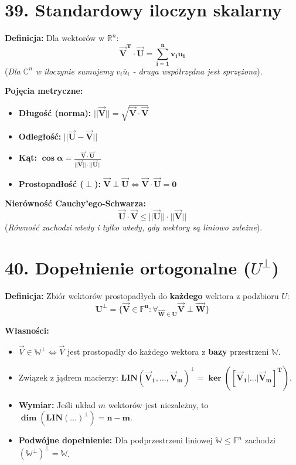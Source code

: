 \documentclass[12pt,a4paper]{article}
\begin{document}
\section*{39. Standardowy iloczyn skalarny}
\noindent\textbf{Definicja:} Dla wektorów w $\mathbb{R}^n$: %
$$ \mathbf{\vec{V}^T \cdot \vec{U} = \sum_{i=1}^n v_i u_i} $$ %
(\textit{Dla $\mathbb{C}^n$ w iloczynie sumujemy $v_i \overline{u}_i$ - druga współrzędna jest sprzężona}). %

\noindent\textbf{Pojęcia metryczne:} %
\begin{itemize}
    \item \textbf{Długość (norma):} $\mathbf{||\vec{V}|| = \sqrt{\vec{V} \cdot \vec{V}}}$ %
    \item \textbf{Odległość:} $\mathbf{||\vec{U} - \vec{V}||}$ %
    \item \textbf{Kąt:} $\mathbf{\cos \alpha = \frac{\vec{V} \cdot \vec{U}}{||\vec{V}|| \cdot ||\vec{U}||}}$ %
    \item \textbf{Prostopadłość ($\perp$):} $\mathbf{\vec{V} \perp \vec{U} \iff \vec{V} \cdot \vec{U} = 0}$ %
\end{itemize}

\noindent\textbf{Nierówność Cauchy'ego-Schwarza:} %
$$ \mathbf{\vec{U} \cdot \vec{V} \le ||\vec{U}|| \cdot ||\vec{V}||} $$ %
(\textit{Równość zachodzi wtedy i tylko wtedy, gdy wektory są liniowo zależne}). %

\section*{40. Dopełnienie ortogonalne ($U^\perp$)}
\noindent\textbf{Definicja:} Zbiór wektorów prostopadłych do \textbf{każdego} wektora z podzbioru $U$: %
$$ \mathbf{U^\perp = \{\vec{V} \in \mathbb{F}^n : \forall_{\vec{W} \in U} \vec{V} \perp \vec{W}\}} $$ %

\noindent\textbf{Własności:} %
\begin{itemize}
    \item $\vec{V} \in \mathbb{W}^\perp \iff \vec{V}$ jest prostopadły do każdego wektora z \textbf{bazy} przestrzeni $\mathbb{W}$. %
    \item Związek z jądrem macierzy: $\mathbf{LIN(\vec{V}_1, \dots, \vec{V}_m)^\perp = \ker([\vec{V}_1 | \dots | \vec{V}_m]^T)}$. %
    \item \textbf{Wymiar:} Jeśli układ $m$ wektorów jest niezależny, to $\mathbf{\dim(LIN(\dots)^\perp) = n - m}$. %
    \item \textbf{Podwójne dopełnienie:} Dla podprzestrzeni liniowej $\mathbb{W} \le \mathbb{F}^n$ zachodzi $\mathbf{(\mathbb{W}^\perp)^\perp = \mathbb{W}}$. %
\end{itemize}
\end{document}

